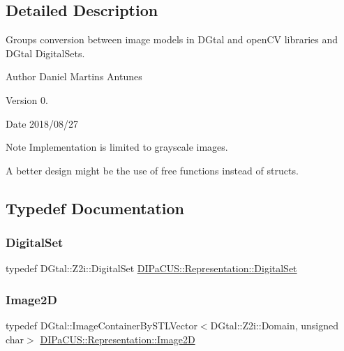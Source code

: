 \subsection{Detailed Description}
Groups conversion between image models in D\+Gtal and open\+CV libraries and D\+Gtal Digital\+Sets. 

\begin{DoxyAuthor}{Author}
Daniel Martins Antunes 
\end{DoxyAuthor}
\begin{DoxyVersion}{Version}
0. 
\end{DoxyVersion}
\begin{DoxyDate}{Date}
2018/08/27 
\end{DoxyDate}
\begin{DoxyNote}{Note}
Implementation is limited to grayscale images. 

A better design might be the use of free functions instead of structs. 
\end{DoxyNote}


\subsection{Typedef Documentation}
\mbox{\label{namespaceDIPaCUS_1_1Representation_a6eca0b4fa262f2d600f11d82ee10b5a6}} 
\subsubsection{\texorpdfstring{Digital\+Set}{DigitalSet}}
{\footnotesize\ttfamily typedef D\+Gtal\+::\+Z2i\+::\+Digital\+Set \mbox{\hyperlink{namespaceDIPaCUS_1_1Representation_a6eca0b4fa262f2d600f11d82ee10b5a6}{D\+I\+Pa\+C\+U\+S\+::\+Representation\+::\+Digital\+Set}}}

\mbox{\label{namespaceDIPaCUS_1_1Representation_ae97917e89f57298fda1626daad9f1733}} 
\subsubsection{\texorpdfstring{Image2D}{Image2D}}
{\footnotesize\ttfamily typedef D\+Gtal\+::\+Image\+Container\+By\+S\+T\+L\+Vector$<$D\+Gtal\+::\+Z2i\+::\+Domain, unsigned char$>$ \mbox{\hyperlink{namespaceDIPaCUS_1_1Representation_ae97917e89f57298fda1626daad9f1733}{D\+I\+Pa\+C\+U\+S\+::\+Representation\+::\+Image2D}}}

